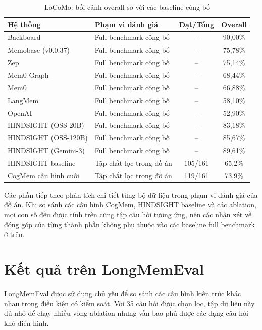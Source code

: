 \documentclass[../main.tex]{subfiles}
\begin{document}
\begin{table}[H]
\centering
\caption{LoCoMo: bối cảnh overall so với các baseline công bố}
\label{tab:locomo_published_overall_context}
\small
\begin{tabularx}{\linewidth}{@{}p{5.0cm}p{5.6cm}cc@{}}
\toprule
\textbf{Hệ thống} & \textbf{Phạm vi đánh giá} & \textbf{Đạt/Tổng} & \textbf{Overall} \\
\midrule
Backboard & Full benchmark công bố & -- & 90,00\% \\
Memobase (v0.0.37) & Full benchmark công bố & -- & 75,78\% \\
Zep & Full benchmark công bố & -- & 75,14\% \\
Mem0-Graph & Full benchmark công bố & -- & 68,44\% \\
Mem0 & Full benchmark công bố & -- & 66,88\% \\
LangMem & Full benchmark công bố & -- & 58,10\% \\
OpenAI & Full benchmark công bố & -- & 52,90\% \\
HINDSIGHT (OSS-20B) & Full benchmark công bố & -- & 83,18\% \\
HINDSIGHT (OSS-120B) & Full benchmark công bố & -- & 85,67\% \\
HINDSIGHT (Gemini-3) & Full benchmark công bố & -- & 89,61\% \\
\midrule
HINDSIGHT baseline & Tập chắt lọc trong đồ án & 105/161 & 65,2\% \\
CogMem cấu hình cuối & Tập chắt lọc trong đồ án & 119/161 & 73,9\% \\
\bottomrule
\end{tabularx}
\end{table}

Các phần tiếp theo phân tích chi tiết từng bộ dữ liệu trong phạm vi đánh giá của đồ án. Khi so sánh các cấu hình CogMem, HINDSIGHT baseline và các ablation, mọi con số đều được tính trên cùng tập câu hỏi tương ứng, nên các nhận xét về đóng góp của từng thành phần không phụ thuộc vào các baseline full benchmark ở trên.

\section{Kết quả trên LongMemEval}

LongMemEval được sử dụng chủ yếu để so sánh các cấu hình kiến trúc khác nhau trong điều kiện có kiểm soát. Với 35 câu hỏi được chọn lọc, tập dữ liệu này đủ nhỏ để chạy nhiều vòng ablation nhưng vẫn bao phủ được các dạng câu hỏi khó điển hình.
\end{document}
